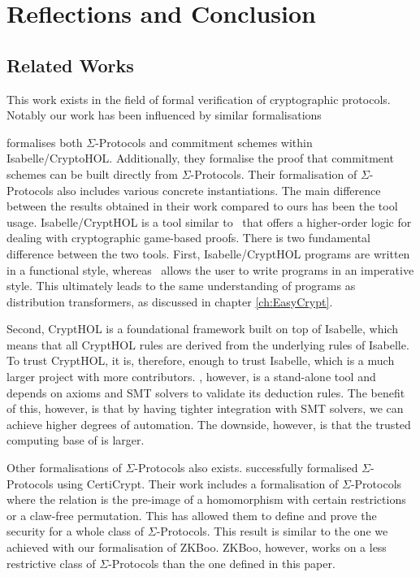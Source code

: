 \chapter{Reflections and Conclusion}
\label{sec:reflection_conclusion}

\section{Related Works}
\label{sec:related_works}
This work exists in the field of formal verification of cryptographic protocols.
Notably our work has been influenced by similar formalisations
\cite{cryptoeprint:2019:1185,DBLP:journals/corr/MetereD17,certicrypt_sigma,zkcrypt,Yao}

\cite{cryptoeprint:2019:1185} formalises both $\Sigma$-Protocols and
commitment schemes within Isabelle/CryptoHOL. Additionally, they formalise
the proof that commitment schemes can be built directly from $\Sigma$-Protocols.
Their formalisation of $\Sigma$-Protocols also includes various concrete instantiations.
The main difference between the results obtained in their work compared to ours
has been the tool usage. Isabelle/CryptHOL is a tool similar to \easycrypt\ that
offers a higher-order logic for dealing with cryptographic game-based proofs.
There is two fundamental difference between the two tools.
First, Isabelle/CryptHOL programs are written in a functional style, whereas
\easycrypt\ allows the user to write programs in an imperative style. This
ultimately leads to the same understanding of programs as distribution
transformers, as discussed in chapter \ref{ch:EasyCrypt}.

Second, CryptHOL is a foundational framework built on top of Isabelle, which
means that all CryptHOL rules are derived from the underlying rules of Isabelle.
To trust CryptHOL, it is, therefore, enough to trust Isabelle, which is a much
larger project with more contributors. \easycrypt, however, is a stand-alone
tool and depends on axioms and SMT solvers to validate its deduction rules.
The benefit of this, however, is that by having tighter integration with SMT
solvers, we can achieve higher degrees of automation. The downside, however, is
that the trusted computing base of \easycrypt is larger.

Other formalisations of $\Sigma$-Protocols also exists. \cite{certicrypt_sigma}
successfully formalised $\Sigma$-Protocols using CertiCrypt. Their work includes a
formalisation of $\Sigma$-Protocols where the relation is the pre-image of a
homomorphism with certain restrictions or a claw-free permutation. This has
allowed them to define and prove the security for a whole class of
$\Sigma$-Protocols.
This result is similar to the one we achieved with our
formalisation of ZKBoo. ZKBoo, however, works on a less restrictive class of
$\Sigma$-Protocols than the one defined in this paper.


